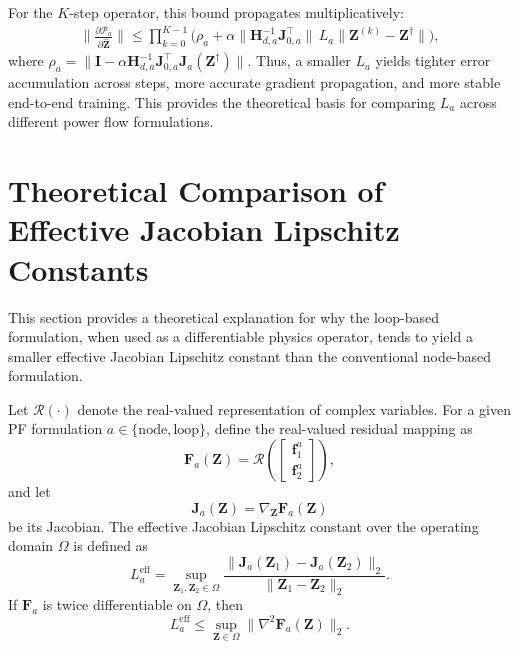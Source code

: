 \documentclass[journal]{IEEEtran}
\begin{document}
For the $K$-step operator, this bound propagates multiplicatively:
\begin{multline}
\Big\|\frac{\partial\mathcal{P}_{a}}{\partial\hat{\mathbf{Z}}}\Big\|
\leq\prod_{k=0}^{K-1}
\Big(\rho_{a}
+\alpha\|\mathbf{H}_{d,a}^{-1}\mathbf{J}_{0,a}^{\top}\|\,L_{a}
\|\mathbf{Z}^{(k)}-\mathbf{Z}^\dagger\|\Big),
\end{multline}
where $\rho_{a}=\|\mathbf{I}-\alpha\mathbf{H}_{d,a}^{-1}\mathbf{J}_{0,a}^{\top}\mathbf{J}_{a}(\mathbf{Z}^\dagger)\|$. Thus, a smaller $L_{a}$ yields tighter error accumulation across steps, more accurate gradient propagation, and more stable end-to-end training. This provides the theoretical basis for comparing $L_{a}$ across different power flow formulations.

\section{Theoretical Comparison of Effective Jacobian Lipschitz Constants}
\label{appendix:lipschitz_comparison}

This section provides a theoretical explanation for why the loop-based formulation, when used as a differentiable physics operator, tends to yield a smaller effective Jacobian Lipschitz constant than the conventional node-based formulation.

Let $\mathcal{R}(\cdot)$ denote the real-valued representation of complex variables.
For a given PF formulation $a\in\{\mathrm{node},\mathrm{loop}\}$, define the real-valued residual mapping as
\begin{equation}
\mathbf{F}_{a}(\mathbf{Z})
=
\mathcal{R}
\left(
\begin{bmatrix}
\mathbf{f}_{1}^{a}\\
\mathbf{f}_{2}^{a}
\end{bmatrix}
\right),
\end{equation}
and let
\begin{equation}
\mathbf{J}_{a}(\mathbf{Z})
=
\nabla_{\mathbf{Z}}\mathbf{F}_{a}(\mathbf{Z})
\end{equation}
be its Jacobian. The effective Jacobian Lipschitz constant over the operating domain $\Omega$ is defined as
\begin{equation}
L_{a}^{\mathrm{eff}}
=
\sup_{\mathbf{Z}_1,\mathbf{Z}_2\in\Omega}
\frac{
\|\mathbf{J}_{a}(\mathbf{Z}_1)-\mathbf{J}_{a}(\mathbf{Z}_2)\|_2
}{
\|\mathbf{Z}_1-\mathbf{Z}_2\|_2
}.
\end{equation}
If $\mathbf{F}_{a}$ is twice differentiable on $\Omega$, then
\begin{equation}
L_{a}^{\mathrm{eff}}
\leq
\sup_{\mathbf{Z}\in\Omega}
\|\nabla^2\mathbf{F}_{a}(\mathbf{Z})\|_2.
\end{equation}
\end{document}
